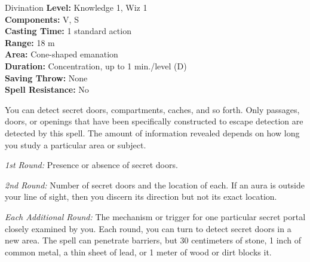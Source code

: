 {Divination}
{
	\textbf{Level:}
	Knowledge 1, Wiz 1\\
	\textbf{Components:}
	V, S\\
	\textbf{Casting Time:}
	1 standard action\\
	\textbf{Range:}
	18 m\\
	\textbf{Area:}
	Cone-shaped emanation\\
	\textbf{Duration:}
	Concentration, up to 1 min./level (D)\\
	\textbf{Saving Throw:}
	None\\
	\textbf{Spell Resistance:}
	No\\
}
{
	You can detect secret doors, compartments, caches, and so forth. Only passages, doors, or openings that have been specifically constructed to escape detection are detected by this spell. The amount of information revealed depends on how long you study a particular area or subject.

	\textit{1st Round:}
	Presence or absence of secret doors.

	\textit{2nd Round:}
	Number of secret doors and the location of each. If an aura is outside your line of sight, then you discern its direction but not its exact location.

	\textit{Each Additional Round:}
	The mechanism or trigger for one particular secret portal closely examined by you. Each round, you can turn to detect secret doors in a new area. The spell can penetrate barriers, but 30 centimeters of stone, 1 inch of common metal, a thin sheet of lead, or 1 meter of wood or dirt blocks it.

}
